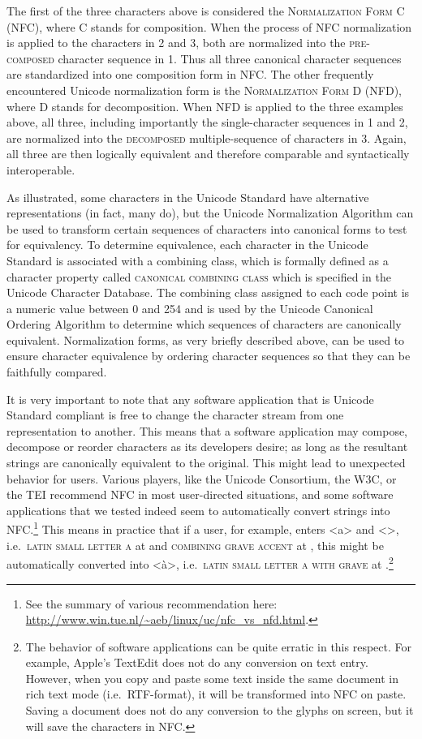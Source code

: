 The first of the three characters above is considered the \textsc{Normalization
Form C (NFC)}, where \textsc{C} stands for composition. When the process of NFC
normalization is applied to the characters in 2 and 3, both 
are normalized into the \textsc{pre-composed} character sequence in 1. Thus all
three canonical character sequences are standardized into one composition form
in NFC. The other frequently encountered Unicode normalization form is the
\textsc{Normalization Form D (NFD)}, where \textsc{D} stands for decomposition.
When NFD is applied to the three examples above, all three, including
importantly the single-character sequences in 1 and 2, are normalized into the
\textsc{decomposed} multiple-sequence of characters in 3. Again, all three are
then logically equivalent and therefore comparable and syntactically
interoperable.

As illustrated, some characters in the Unicode Standard have alternative
representations (in fact, many do), but the Unicode Normalization Algorithm can
be used to transform certain sequences of characters into canonical
forms to test for equivalency. To determine equivalence, each
character in the Unicode Standard is associated with a combining class, which is
formally defined as a character property called \textsc{canonical combining
class} which is specified in the Unicode Character Database. The combining class
assigned to each code point is a numeric value between 0 and 254 and is used by
the Unicode Canonical Ordering Algorithm to determine which sequences of
characters are canonically equivalent. Normalization forms, as very briefly
described above, can be used to ensure character equivalence by ordering
character sequences so that they can be faithfully compared.

It is very important to note that any software application that is Unicode
Standard compliant is free to change the character stream from one
representation to another. This means that a software application may compose,
decompose or reorder characters as its developers desire; as long as the
resultant strings are canonically equivalent to the original. This might lead to
unexpected behavior for users. Various players, like the Unicode Consortium, the
W{\large 3}C, or the TEI recommend NFC in most user-directed situations, and
some software applications that we tested indeed seem to automatically convert
strings into NFC.\footnote{See the summary of various recommendation here:
\url{http://www.win.tue.nl/~aeb/linux/uc/nfc_vs_nfd.html}.} This means in
practice that if a user, for example, enters <a> and <>, i.e.~\textsc{latin
small letter a} at  and \textsc{combining grave accent} at ,
this might be automatically converted into <à>, i.e.~\textsc{latin small letter
a with grave} at .\footnote{The behavior of software applications can
be quite erratic in this respect. For example, Apple's TextEdit does not do any
conversion on text entry. However, when you copy and paste some text inside the
same document in rich text mode (i.e.~RTF-format), it will be transformed into
NFC on paste. Saving a document does not do any conversion to the glyphs on
screen, but it will save the characters in NFC.}


